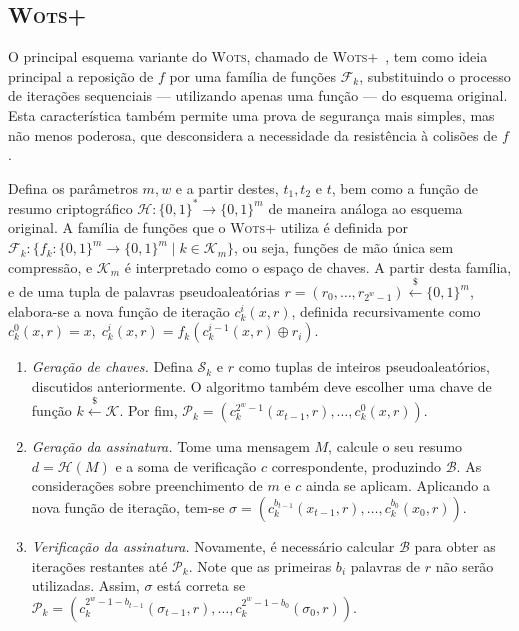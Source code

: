 \documentclass[12pt]{report}
\newcommand{\pk}{$\mathcal{P}_k$}
\newcommand{\sk}{$\mathcal{S}_k$}
\newcommand{\binwds}[1]{\{0, 1\}^{#1}}
\begin{document}
\subsection{\textsc{Wots+}}

O principal esquema variante do \textsc{Wots}, chamado de \textsc{Wots+}~\cite{cryptoeprint:2017:965}, tem como ideia principal a reposição de $f$ por uma família de funções $\mathcal{F}_k$, substituindo o processo de iterações sequenciais --- utilizando apenas uma função --- do esquema original. Esta característica também permite uma prova de segurança mais simples, mas não menos poderosa, que desconsidera a necessidade da resistência à colisões de $f$.

Defina os parâmetros $m, w$ e a partir destes, $t_1, t_2 \text{ e } t$, bem como a função de resumo criptográfico $\mathcal{H} : \binwds{*} \longrightarrow \binwds{m}$ de maneira análoga ao esquema original. A família de funções que o \textsc{Wots+} utiliza é definida por $\mathcal{F}_k : \{f_k : \binwds{m} \longrightarrow \binwds{m} \mid k \in \mathcal{K}_m\}$, ou seja, funções de mão única sem compressão, e $\mathcal{K}_m$ é interpretado como o espaço de chaves. A partir desta família, e de uma tupla de palavras pseudoaleatórias $r = (r_0, \dots, r_{2^w - 1}) \stackrel{\$}{\longleftarrow} \binwds{m}$, elabora-se a nova função de iteração $c^{i}_{k}(x, r)$, definida recursivamente como $c^{0}_{k}(x, r) = x, \; c^{i}_{k}(x, r) = f_k(c^{i-1}_{k}(x, r) \oplus r_i)$.

\begin{enumerate}

    \item[] \emph{Geração de chaves.} Defina \sk{} e $r$ como tuplas de inteiros pseudoaleatórios, discutidos anteriormente. O algoritmo também deve escolher uma chave de função $k \stackrel{\$}\longleftarrow \mathcal{K}$. Por fim, $\text{\pk{}} = (c^{2^w-1}_{k}(x_{t-1}, r), \dots, c^{0}_{k}(x, r))$.
    
    \item[] \emph{Geração da assinatura.} Tome uma mensagem $M$, calcule o seu resumo $d = \mathcal{H}(M)$ e a soma de verificação $c$ correspondente, produzindo $\mathcal{B}$. As considerações sobre preenchimento de $m$ e $c$ ainda se aplicam. Aplicando a nova função de iteração, tem-se $\sigma = (c^{b_{t - 1}}_{k}(x_{t-1}, r), \dots, c^{b_{0}}_{k}(x_{0}, r))$.
    
    \item[] \emph{Verificação da assinatura.} Novamente, é necessário calcular $\mathcal{B}$ para obter as iterações restantes até \pk{}. Note que as primeiras $b_i$ palavras de $r$ não serão utilizadas. Assim, $\sigma$ está correta se $\text{\pk{}} = (c^{2^{w} - 1 - b_{t - 1}}_{k}(\sigma_{t-1}, r), \dots, c^{2^{w} - 1 - b_{0}}_{k}(\sigma_{0}, r))$. 

\end{enumerate}
\end{document}
